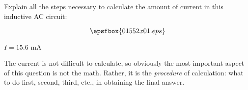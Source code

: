

Explain all the steps necessary to calculate the amount of current in this inductive AC circuit:

$$\epsfbox{01552x01.eps}$$







$I = 15.6$ mA







The current is not difficult to calculate, so obviously the most important aspect of this question is not the math.  Rather, it is the {\it procedure} of calculation: what to do first, second, third, etc., in obtaining the final answer.




